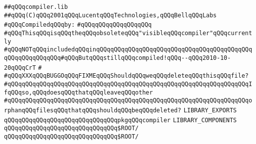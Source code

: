 \label{src/lib/core/compiler/compiler.lib}
\verb|##qQQqcompiler.lib|\newline
\verb|##qQQq(C)qQQq2001qQQqLucentqQQqTechnologies,qQQqBellqQQqLabs|\newline
\newline
\verb|#qQQqCompiledqQQqby:|\newline
\verb|#qQQqqQQqqQQqqQQqqQQq|\newline
\newline
\newline
\newline
\verb|#qQQqThisqQQqisqQQqtheqQQqobsoleteqQQq"visibleqQQqcompiler"qQQqcurrently|\newline
\verb|#qQQqNOTqQQqincludedqQQqinqQQq|\verb|qQQqqQQqqQQqqQQqqQQqqQQqqQQqqQQqqQQqqQQqqQQqqQQqqQQqqQQq#qQQqButqQQqstillqQQqcompiled!qQQq--qQQq2010-10-20qQQqCrT|\newline
\verb|#|\newline
\verb|#qQQqXXXqQQqBUGGOqQQqFIXMEqQQqShouldqQQqweqQQqdeleteqQQqthisqQQqfile?|\newline
\verb|#qQQqqQQqqQQqqQQqqQQqqQQqqQQqqQQqqQQqqQQqqQQqqQQqqQQqqQQqqQQqqQQqqQQqIfqQQqso,qQQqdoesqQQqthatqQQqleaveqQQqother|\newline
\verb|#qQQqqQQqqQQqqQQqqQQqqQQqqQQqqQQqqQQqqQQqqQQqqQQqqQQqqQQqqQQqqQQqqQQqorphanqQQqfilesqQQqthatqQQqshouldqQQqbeqQQqdeleted?|\newline
\newline
\newline
\newline
\verb|LIBRARY_EXPORTS|\newline
\newline
\verb|qQQqqQQqqQQqqQQqqQQqqQQqqQQqqQQqpkgqQQqcompiler|\newline
\newline
\newline
\newline
\verb|LIBRARY_COMPONENTS|\newline
\newline
\verb|qQQqqQQqqQQqqQQqqQQqqQQqqQQqqQQq$ROOT/|\newline
\newline
\verb|qQQqqQQqqQQqqQQqqQQqqQQqqQQqqQQq$ROOT/|\newline

